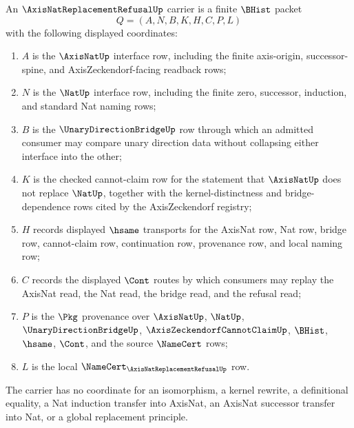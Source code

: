 \begin{definition}
\label{def:axisnat-replacement-refusal-carrier}
An $\AxisNatReplacementRefusalUp$ carrier is a finite $\BHist$ packet
$$
Q=(A,N,B,K,H,C,P,L)
$$
with the following displayed coordinates:
\begin{enumerate}
\item $A$ is the $\AxisNatUp$ interface row, including the finite axis-origin, successor-spine, and AxisZeckendorf-facing readback rows;
\item $N$ is the $\NatUp$ interface row, including the finite zero, successor, induction, and standard Nat naming rows;
\item $B$ is the $\UnaryDirectionBridgeUp$ row through which an admitted consumer may compare unary direction data without collapsing either interface into the other;
\item $K$ is the checked cannot-claim row for the statement that $\AxisNatUp$ does not replace $\NatUp$, together with the kernel-distinctness and bridge-dependence rows cited by the AxisZeckendorf registry;
\item $H$ records displayed $\hsame$ transports for the AxisNat row, Nat row, bridge row, cannot-claim row, continuation row, provenance row, and local naming row;
\item $C$ records the displayed $\Cont$ routes by which consumers may replay the AxisNat read, the Nat read, the bridge read, and the refusal read;
\item $P$ is the $\Pkg$ provenance over $\AxisNatUp$, $\NatUp$, $\UnaryDirectionBridgeUp$, $\AxisZeckendorfCannotClaimUp$, $\BHist$, $\hsame$, $\Cont$, and the source $\NameCert$ rows;
\item $L$ is the local $\NameCert_{\AxisNatReplacementRefusalUp}$ row.
\end{enumerate}
The carrier has no coordinate for an isomorphism, a kernel rewrite, a definitional equality, a Nat induction transfer into AxisNat, an AxisNat successor transfer into Nat, or a global replacement principle.
\end{definition}

